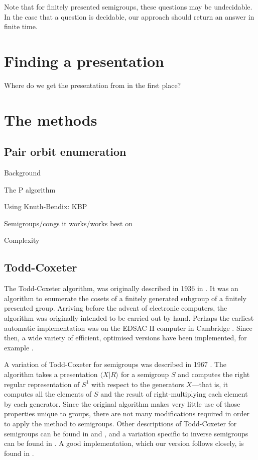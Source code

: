 Note that for finitely presented semigroups, these questions may be
undecidable.  In the case that a question is decidable, our approach should
return an answer in finite time.

\section{Finding a presentation}

Where do we get the presentation from in the first place?

\section{The methods}

\subsection{Pair orbit enumeration}
\label{sec:p}

Background

The P algorithm

Using Knuth-Bendix: KBP

Semigroups/congs it works/works best on

Complexity

\subsection{Todd-Coxeter}
\label{sec:tc}

The Todd-Coxeter algorithm, was originally described in 1936 in
\cite{todd_coxeter_1936}.  It was an algorithm to enumerate the cosets of a
finitely generated subgroup of a finitely presented group.  Arriving before the
advent of electronic computers, the algorithm was originally intended to be
carried out by hand.  Perhaps the earliest automatic implementation was on the
EDSAC II computer in Cambridge \cite{leech_1963}.  Since then, a wide variety of
efficient, optimised versions have been implemented, for example \cite{ace}.

A variation of Todd-Coxeter for semigroups was described in 1967
\cite{neumann_1967}.  The algorithm takes a presentation $\langle X | R \rangle$
for a semigroup $S$ and computes the right regular representation of $S^1$ with
respect to the generators $X$---that is, it computes all the elements of $S$ and
the result of right-multiplying each element by each generator.  Since the
original algorithm makes very little use of those properties unique to groups,
there are not many modifications required in order to apply the method to
semigroups.  Other descriptions of Todd-Coxeter for semigroups can be found in
\cite[c.12]{ruskuc_thesis} and \cite[1.2]{walker_thesis}, and a variation
specific to inverse semigroups can be found in \cite{cutting_thesis}.  A good
implementation, which our version follows closely, is found in
\cite{pfeiffer_tc}.

